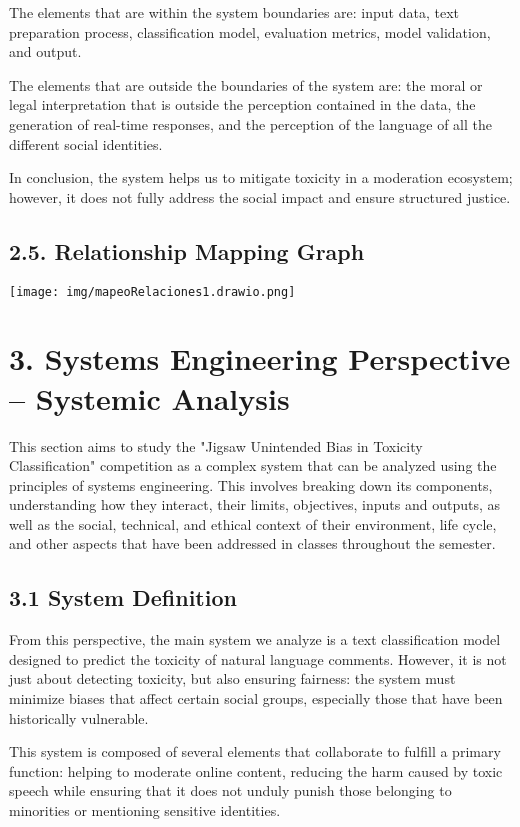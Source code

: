 \documentclass[a4paper,12pt]{article}
\begin{document}
The elements that are within the system boundaries are: input data, text preparation process, classification model, evaluation metrics, model validation, and output.

The elements that are outside the boundaries of the system are: the moral or legal interpretation that is outside the perception contained in the data, the generation of real-time responses, and the perception of the language of all the different social identities.

In conclusion, the system helps us to mitigate toxicity in a moderation ecosystem; however, it does not fully address the social impact and ensure structured justice.

\subsection*{2.5. Relationship Mapping Graph}
\texttt{[image: img/mapeoRelaciones1.drawio.png]}\\[0.5cm]
\section*{3. Systems Engineering Perspective – Systemic Analysis}

This section aims to study the "Jigsaw Unintended Bias in Toxicity Classification" competition as a complex system that can be analyzed using the principles of systems engineering. This involves breaking down its components, understanding how they interact, their limits, objectives, inputs and outputs, as well as the social, technical, and ethical context of their environment, life cycle, and other aspects that have been addressed in classes throughout the semester.

\subsection*{3.1 System Definition}

From this perspective, the main system we analyze is a text classification model designed to predict the toxicity of natural language comments. However, it is not just about detecting toxicity, but also ensuring fairness: the system must minimize biases that affect certain social groups, especially those that have been historically vulnerable.

This system is composed of several elements that collaborate to fulfill a primary function: helping to moderate online content, reducing the harm caused by toxic speech while ensuring that it does not unduly punish those belonging to minorities or mentioning sensitive identities.
\end{document}
